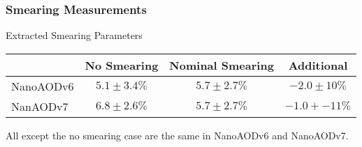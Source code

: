 \documentclass{beamer}
\newcommand{\beginbackup}{
  \newcounter{framenumbervorappendix}
  \setcounter{framenumbervorappendix}{\value{framenumber}}
}
\newcommand{\backupend}{
  \addtocounter{framenumbervorappendix}{-\value{framenumber}}
  \addtocounter{framenumber}{\value{framenumbervorappendix}}
}
\begin{document}
\begin{frame}
  \frametitle{Smearing Measurements}

  \begin{center}
  Extracted Smearing Parameters
  \begin{tabular} {l|c|c|c}
    \hline
    & No Smearing & Nominal Smearing & Additional \\
    \hline
    NanoAODv6 & $5.1 \pm 3.4\%$ & $5.7 \pm 2.7\%$ & $-2.0 \pm 10\%$ \\
    NanAODv7 & $6.8 \pm 2.6\%$ & $5.7 \pm 2.7\%$ & $-1.0 +- 11\%$ \\
    \hline
  \end{tabular}
  \end{center}

  \vfill

  All except the no smearing case are the same in NanoAODv6 and NanoAODv7.

\end{frame}

\begin{comment}
\beginbackup

\begin{frame}
  \centering
    {\Huge \bf\sffamily Backup Slides}
\end{frame}



\backupend
\end{comment}
\end{document}
